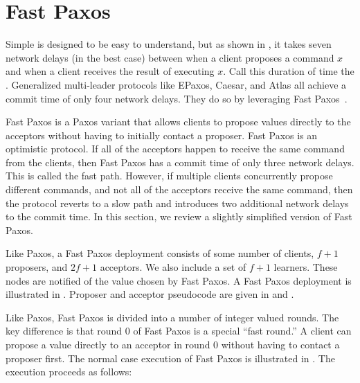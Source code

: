 \section{Fast Paxos}
{}
{}
{}

Simple \BPaxos{} is designed to be easy to understand, but as shown in
, it takes seven network delays (in the best case)
between when a client proposes a command $x$ and when a client receives the
result of executing $x$. Call this duration of time the .
Generalized multi-leader protocols like EPaxos, Caesar, and Atlas all achieve a
commit time of only four network delays. They do so by leveraging Fast
Paxos~\cite{lamport2006fast}.

Fast Paxos is a Paxos variant that allows clients to propose values directly to
the acceptors without having to initially contact a proposer. Fast Paxos is an
optimistic protocol. If all of the acceptors happen to receive the same command
from the clients, then Fast Paxos has a commit time of only three network
delays. This is called the fast path. However, if multiple clients concurrently
propose different commands, and not all of the acceptors receive the same
command, then the protocol reverts to a slow path and introduces two additional
network delays to the commit time.  In this section, we review a slightly
simplified version of Fast Paxos.

Like Paxos, a Fast Paxos deployment consists of some number of clients, $f+1$
proposers, and $2f+1$ acceptors. We also include a set of $f+1$ learners. These
nodes are notified of the value chosen by Fast Paxos. A Fast Paxos deployment
is illustrated in . Proposer and acceptor pseudocode
are given in  and .

Like Paxos, Fast Paxos is divided into a number of integer valued rounds.  The
key difference is that round 0 of Fast Paxos is a special ``fast round.'' A
client can propose a value directly to an acceptor in round 0 without having to
contact a proposer first. The normal case execution of Fast Paxos is
illustrated in . The execution proceeds as follows:

